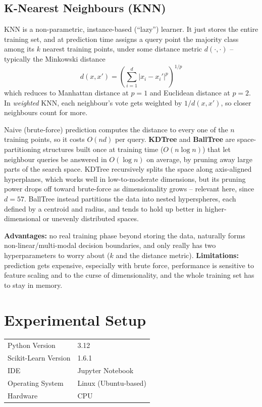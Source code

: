 \documentclass[12pt,a4paper]{article}
\begin{document}
\subsection{K-Nearest Neighbours (KNN)}
KNN is a non-parametric, instance-based (``lazy'') learner. It just stores the entire training set, and at prediction time assigns a query point the majority class among its $k$ nearest training points, under some distance metric $d(\cdot,\cdot)$ -- typically the Minkowski distance
\[
d(x,x') = \left(\sum_{i=1}^{d}|x_i-x_i'|^{p}\right)^{1/p}
\]
which reduces to Manhattan distance at $p=1$ and Euclidean distance at $p=2$. In \emph{weighted} KNN, each neighbour's vote gets weighted by $1/d(x,x')$, so closer neighbours count for more.
 
Naive (brute-force) prediction computes the distance to every one of the $n$ training points, so it costs $O(nd)$ per query. \textbf{KDTree} and \textbf{BallTree} are space-partitioning structures built once at training time ($O(n\log n)$) that let neighbour queries be answered in $O(\log n)$ on average, by pruning away large parts of the search space. KDTree recursively splits the space along axis-aligned hyperplanes, which works well in low-to-moderate dimensions, but its pruning power drops off toward brute-force as dimensionality grows -- relevant here, since $d=57$. BallTree instead partitions the data into nested hyperspheres, each defined by a centroid and radius, and tends to hold up better in higher-dimensional or unevenly distributed spaces.
 
\textbf{Advantages:} no real training phase beyond storing the data, naturally forms non-linear/multi-modal decision boundaries, and only really has two hyperparameters to worry about ($k$ and the distance metric). \textbf{Limitations:} prediction gets expensive, especially with brute force, performance is sensitive to feature scaling and to the curse of dimensionality, and the whole training set has to stay in memory.

\section{Experimental Setup}
\begin{tabular}{ll}
\toprule
Python Version & 3.12 \\
Scikit-Learn Version & 1.6.1 \\
IDE & Jupyter Notebook \\
Operating System & Linux (Ubuntu-based) \\
Hardware & CPU \\
\bottomrule
\end{tabular}
\end{document}
